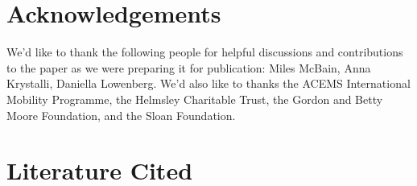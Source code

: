 \documentclass[
]{article}
\begin{document}
\hypertarget{acknowledgements}{%
\section{Acknowledgements}\label{acknowledgements}}

We'd like to thank the following people for helpful discussions and contributions to the paper as we were preparing it for publication: Miles McBain, Anna Krystalli, Daniella Lowenberg. We'd also like to thanks the ACEMS International Mobility Programme, the Helmsley Charitable Trust, the Gordon and Betty Moore Foundation, and the Sloan Foundation.

\hypertarget{literature-cited}{%
\section*{Literature Cited}\label{literature-cited}}
\end{document}
